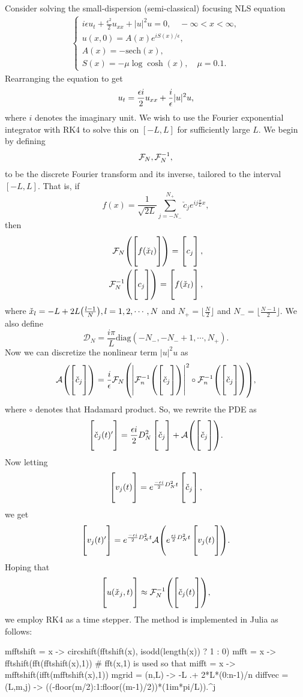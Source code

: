 \documentclass[12pt]{report}
\begin{document}
\begin{solution}
    \noindent
    Consider solving the small-dispersion (semi-classical) focusing NLS equation
    \begin{align*}
        \begin{cases}
            i \epsilon u_t + \frac{\epsilon^2}{2} u_{xx} + |u|^2 u = 0, \quad -\infty < x < \infty,\\
            u(x,0) = A(x) e^{i S(x)/\epsilon},\\
            A(x) = - \mathrm{sech}(x),\\
            S(x) = - \mu \log \cosh (x), \quad \mu = 0.1.
        \end{cases}
    \end{align*}
    Rearranging the equation to get
    \[
        u_t = \frac{\epsilon i}{2} u_{xx} + \frac{i}{{\epsilon}}|u|^2 u,
    \]
    where $i$ denotes the imaginary unit. We wish to use the Fourier exponential integrator with RK4 to solve this on $[-L,L]$ for sufficiently large $L$. We begin by defining
    \[
        {\mathcal{F}}_N,{\mathcal{F}}_N^{-1},
    \] 
    to be the discrete Fourier transform and its inverse, tailored to the interval $[-L,L]$. That is, if
    \[
        f(x) = \frac{1}{\sqrt{2L}}\sum_{j=-N_{-}}^{N_{+}} \check{c}_j e^{i j \frac{\pi}{L}x},
    \]
    then
    \begin{align*}
        {\mathcal{F}}_N{\left(\begin{bmatrix} \\ f(\check{x}_l) \\ \\ \end{bmatrix}\right)} = \begin{bmatrix} \\ c_j \\ \\ \end{bmatrix},\\
        {\mathcal{F}}^{-1}_N {\left(\begin{bmatrix} \\ c_j \\ \\ \end{bmatrix}\right)} = \begin{bmatrix} \\ f(\check{x}_l) \\ \\ \end{bmatrix}, 
    \end{align*}
    where $\check{x}_l = -L + 2L {\left(\frac{l-1}{N}\right)}, l=1,2,\cdots,N$ and $N_+ = \lfloor \frac{N}{2} \rfloor$ and $N_- = \lfloor \frac{N-1}{2} \rfloor.$ We also define
    \[
        \mathcal{D}_N = \frac{i\pi}{L}\mathrm{diag}(-N_{-},-N_{-}+1,\cdots,N_{+}).
    \]
    Now we can discretize the nonlinear term $|u|^2u$ as
    \[
        \mathcal{A}{\left(\begin{bmatrix} \\ \check{c}_j \\ \\ \end{bmatrix}\right)} = \frac{i}{{\epsilon}}{\mathcal{F}}_N {\left( \left| {\mathcal{F}}_n^{-1}{\left(\begin{bmatrix} \\ {\check{c}}_j \\ \\ \end{bmatrix}\right)}\right|^2 \circ {\mathcal{F}}_n^{-1}{\left(\begin{bmatrix} \\ {\check{c}}_j \\ \\ \end{bmatrix}\right)} \right)},
    \]
    where $\circ$ denotes that Hadamard product. So, we rewrite the PDE as
    \[
        \begin{bmatrix} \\ {\check{c}}_j(t)' \\ \\ \end{bmatrix} = \frac{{\epsilon} i}{2}D_N^2\begin{bmatrix} \\ {\check{c}}_j \\ \\ \end{bmatrix} + \mathcal{A}{\left(\begin{bmatrix} \\ {\check{c}}_j \\ \\ \end{bmatrix}\right)}. 
    \] 
    Now letting 
    \[
        \begin{bmatrix} \\ v_j(t) \\ \\ \end{bmatrix} = e^{\frac{-{\epsilon} i}{2}D_N^2 t}\begin{bmatrix} \\ {\check{c}}_j \\ \\ \end{bmatrix},
    \]
    we get
    \[
        \begin{bmatrix} \\ v_j(t)' \\ \\ \end{bmatrix} = e^{\frac{-{\epsilon} i}{2}D_N^2 t}\mathcal{A}{\left(e^{\frac{{\epsilon} i}{2}D_N^2 t} \begin{bmatrix} \\ v_j(t) \\ \\ \end{bmatrix}\right)}.
    \]
    Hoping that
    \[
        \begin{bmatrix} \\ u(\check{x}_j,t) \\ \\ \end{bmatrix} \approx {\mathcal{F}}_N^{-1}{\left(\begin{bmatrix} \\ {\check{c}}_j(t) \\ \\ \end{bmatrix}\right)},
    \]
    we employ RK4 as a time stepper. The method is implemented in Julia as follows:
    \begin{python}
mfftshift = x -> circshift(fftshift(x), isodd(length(x)) ? 1 : 0)
mfft = x -> fftshift(fft(fftshift(x),1)) # fft(x,1) is used so that
mifft = x -> mfftshift(ifft(mfftshift(x),1))
mgrid = (n,L) -> -L .+ 2*L*(0:n-1)/n
diffvec = (L,m,j) -> ((-floor(m/2):1:floor((m-1)/2))*(1im*pi/L)).^j


\end{python}
\end{solution}
\end{document}

